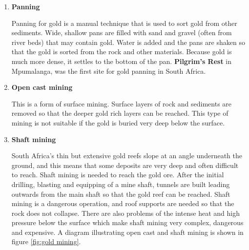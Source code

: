 \begin{enumerate}

\item{\textbf{Panning}

Panning for gold is a manual technique that is used to sort gold from other sediments. Wide, shallow pans are filled with sand and gravel (often from river beds) that may contain gold. Water is added and the pans are shaken so that the gold is sorted from the rock and other materials. Because gold is much more dense, it settles to the bottom of the pan. \textbf{Pilgrim's Rest} in Mpumalanga, was the first site for gold panning in South Africa.
}

\item{\textbf{Open cast mining}

This is a form of surface mining. Surface layers of rock and sediments are removed so that the deeper gold rich layers can be reached. This type of mining is not suitable if the gold is buried very deep below the surface.
}
\pagebreak
\item{\textbf{Shaft mining}

South Africa's thin but extensive gold reefs slope at an angle underneath the ground, and this means that some deposits are very deep and often difficult to reach.  Shaft mining is needed to reach the gold ore. After the initial drilling, blasting and equipping of a mine shaft, tunnels are built leading outwards from the main shaft so that the gold reef can be reached. Shaft mining is a dangerous operation, and roof supports are needed so that the rock does not collapse. There are also problems of the intense heat and high pressure below the surface which make shaft mining very complex, dangerous and expensive. A diagram illustrating open cast and shaft mining is shown in figure \ref{fig:gold mining}.
}


\end{enumerate}
